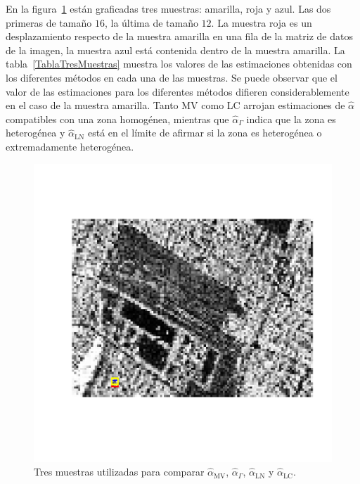 En la figura~\ref{TresMuestras} están graficadas tres muestras: amarilla, roja y azul. Las dos primeras de tamaño $16$, la última de tamaño $12$. La muestra roja es un desplazamiento respecto de la muestra amarilla en una fila de la matriz de datos de la imagen, la muestra azul está contenida dentro de la muestra amarilla. La tabla~\ref{TablaTresMuestras} muestra los valores de las estimaciones obtenidas con los diferentes métodos en cada una de las muestras. Se puede observar que el valor de las estimaciones para los diferentes métodos difieren considerablemente en el caso de la muestra amarilla. Tanto MV como LC arrojan estimaciones de $\widehat{\alpha}$ compatibles con una zona homogénea, mientras que $\widehat{\alpha}_{\Gamma}$ indica que la zona es heterogénea y $\widehat{\alpha}_{\text{LN}}$ está en el límite de afirmar si la zona es heterogénea o extremadamente heterogénea.
\begin{figure}[htb]
	\centering
	\includegraphics[width=0.8\linewidth]{../../Figures/Tesis/ImagenReal/TresMuestras.pdf}
	\caption{\label{TresMuestras}\small Tres muestras utilizadas para comparar  $\widehat{\alpha}_{\text{MV}}$, $\widehat{\alpha}_{\Gamma}$, $\widehat{\alpha}_{\text{LN}}$ y  $\widehat{\alpha}_{\text{LC}}$.}
\end{figure}

